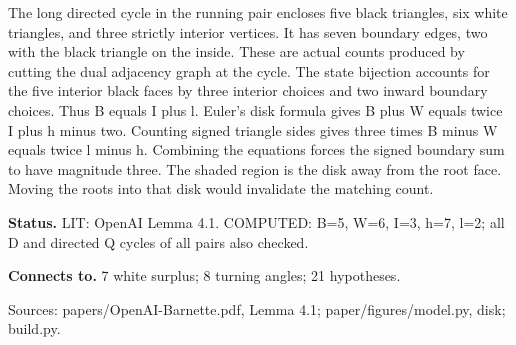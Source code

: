 \documentclass[10pt,a4paper]{amsart}
\begin{document}
The long directed cycle in the running pair encloses five black triangles, six white triangles, and three strictly interior vertices. It has seven boundary edges, two with the black triangle on the inside. These are actual counts produced by cutting the dual adjacency graph at the cycle. The state bijection accounts for the five interior black faces by three interior choices and two inward boundary choices. Thus B equals I plus l. Euler's disk formula gives B plus W equals twice I plus h minus two. Counting signed triangle sides gives three times B minus W equals twice l minus h. Combining the equations forces the signed boundary sum to have magnitude three. The shaded region is the disk away from the root face. Moving the roots into that disk would invalidate the matching count.

\textbf{Status.} LIT: OpenAI Lemma 4.1. COMPUTED: B=5, W=6, I=3, h=7, l=2; all D and directed Q cycles of all pairs also checked.

\textbf{Connects to.} 7 white surplus; 8 turning angles; 21 hypotheses.

{\footnotesize\raggedright Sources: papers/\allowbreak{}OpenAI-Barnette.pdf, Lemma 4.1;\allowbreak{} paper/\allowbreak{}figures/\allowbreak{}model.py, disk;\allowbreak{} build.py.\par}
\end{document}
